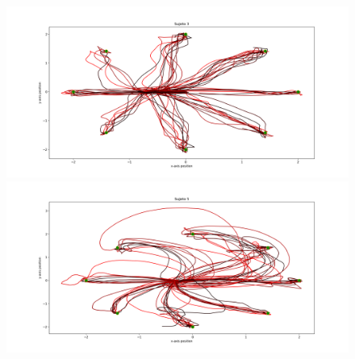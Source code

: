 \documentclass[pdf]{beamer}
\begin{document}
\begin{frame}
\begin{columns}
\begin{column}{0.5\textwidth}
		\begin{figure}
		\includegraphics[width=\textwidth]{sujeto3/force/trayectorias}
		\includegraphics[width=\textwidth]{sujeto5/force/trayectorias}
	\end{figure}
\end{column}
\end{columns}

\end{frame}
\end{document}
